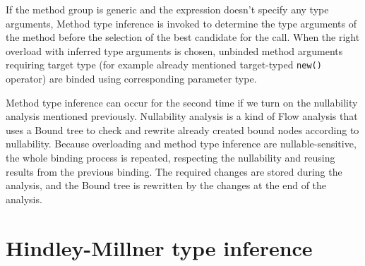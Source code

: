 If the method group is generic and the expression doesn’t specify any type arguments, Method type inference is invoked to determine the type arguments of the method before the selection of the best candidate for the call.
When the right overload with inferred type arguments is chosen, unbinded method arguments requiring target type (for example already mentioned target-typed \texttt{new()} operator) are binded using corresponding parameter type.
\par
{}
Method type inference can occur for the second time if we turn on the nullability analysis mentioned previously. 
Nullability analysis is a kind of Flow analysis that uses a Bound tree to check and rewrite already created bound nodes according to nullability. 
Because overloading and method type inference are nullable-sensitive, the whole binding process is repeated, respecting the nullability and reusing results from the previous binding. 
The required changes are stored during the analysis, and the Bound tree is rewritten by the changes at the end of the analysis.

\section{Hindley-Millner type inference}

